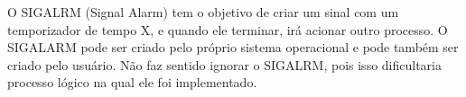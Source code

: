 \begin{question}

    O SIGALRM (Signal Alarm) tem o objetivo de criar um sinal 
    com um temporizador de tempo X, e quando ele terminar, irá
    acionar outro processo. O SIGALARM pode ser criado pelo próprio 
    sistema operacional e pode também ser criado pelo usuário. Não faz
    sentido ignorar o SIGALRM, pois isso dificultaria processo lógico
    na qual ele foi implementado.

\end{question}